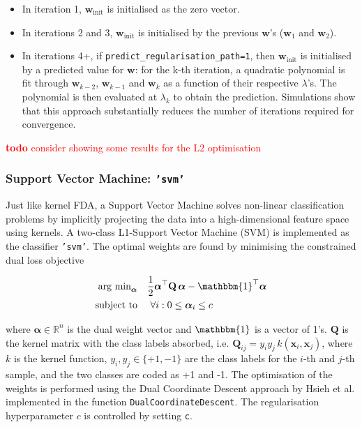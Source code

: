 \documentclass[utf8]{frontiersSCNS} %
\newcommand{\al}{\boldsymbol{\alpha}}
\newcommand{\w}{\mathbf{w}}
\newcommand{\x}{\mathbf{x}}
\newcommand{\Q}{\mathbf{Q}}
\newcommand{\R}{\mathbb{R}}
\newcommand{\ttt}[1]{\texttt{#1}}
\newcommand{\todo}[1]{\textcolor{red}{\textbf{todo} #1}}
\begin{document}
\begin{itemize}
    \item In iteration 1, $\w_\text{init}$ is initialised as the zero vector.
    \item In iterations 2 and 3, $\w_\text{init}$ is initialised by the previous $\w$'s ($\w_1$ and $\w_2$).
    \item In iterations 4+, if \ttt{predict\_regularisation\_path=1}, then $\w_\text{init}$ is initialised by a predicted value for $\w$: for the
  k-th iteration, a quadratic polynomial is fit through $\w_{k-2}$, $\w_{k-1}$ and $\w_k$ as a function of their respective $\lambda$'s. The polynomial is then evaluated at $\lambda_k$ to obtain the prediction. Simulations show that this approach substantially reduces the number of iterations required for convergence.
\end{itemize}{}

\todo{consider showing some results for the L2 optimisation}


\subsubsection{Support Vector Machine: \ttt{'svm'}}

Just like kernel FDA, a Support Vector Machine solves non-linear classification problems by implicitly projecting the data into a high-dimensional feature space using kernels.
A two-class L1-Support Vector Machine (SVM) is implemented as the classifier \ttt{'svm'}.
The optimal weights are found by minimising the constrained dual loss objective

\begin{align}
\begin{split}
\label{eq:svm_dual_loss_function}
\text{arg min}_{\al}\quad
& \frac{1}{2} \al^\top\Q\,\al - \mathbbm{1}^\top\al\\
\text{subject to}\quad  &\ \forall i: 0 \le \al_i \le c
\end{split}
\end{align}

where $\al\in\R^n$ is the dual weight vector and  $\mathbbm{1}$ is a vector of 1's. $\Q$ is the kernel matrix with the class labels absorbed, i.e. $\Q_{ij} = y_i y_j\, k(\x_i,\x_j)$, where $k$ is the kernel function, $y_i, y_j \in\{+1, -1\}$ are the class labels for the $i$-th and $j$-th sample, and the two classes are coded as +1 and -1. The optimisation of the weights is performed using the Dual Coordinate Descent
approach by Hsieh et al. \cite{Hsieh2008ASVM} implemented in the function \ttt{DualCoordinateDescent}. The regularisation hyperparameter $c$ is controlled by setting \ttt{c}.
\end{document}
